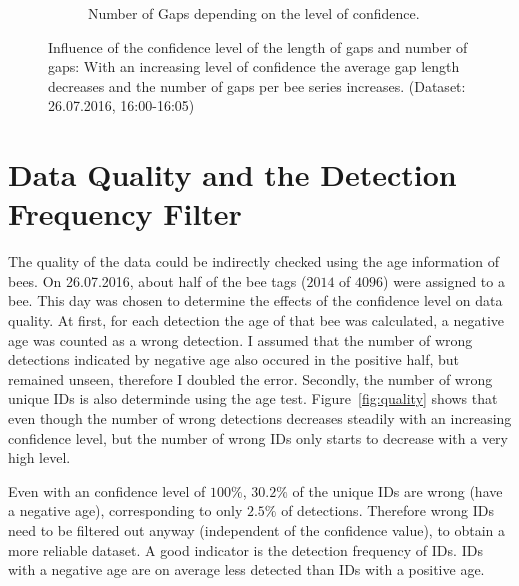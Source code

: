 \begin{figure}
\begin{subfigure}[b]{0.45\textwidth}
		\caption[Number of Gaps]{Number of Gaps depending on the level of confidence.}
		\label{fig:numgaps}
	\end{subfigure}
	\caption[Influence of Confidence Level on Gaps]{Influence of the confidence level of the length of gaps and number of gaps: With an increasing level of confidence the average gap length decreases and the number of gaps per bee series increases. (Dataset: 26.07.2016, 16:00-16:05)}
	\label{fig:gaps}
\end{figure}

\clearpage
\section{Data Quality and the Detection Frequency Filter}
\label{subsec:quality}

The quality of the data could be indirectly checked using the age information of bees. On 26.07.2016, about half of the bee tags ($2014$ of $4096$) were assigned to a bee. This day was chosen to determine the effects of the confidence level on data quality.
At first, for each detection the age of that bee was calculated, a negative age was counted as a wrong detection. I assumed that the number of wrong detections indicated by negative age also occured in the positive half, but remained unseen, therefore I doubled the error. Secondly, the number of wrong unique IDs is also determinde using the age test. Figure~\ref{fig:quality} shows that even though the number of wrong detections
decreases steadily with an increasing confidence level, but the number of wrong IDs only starts to decrease with a very high level.

Even with an confidence level of $100\%$, $30.2\%$ of the unique IDs are wrong (have a negative age), corresponding to only $2.5\%$ of detections. Therefore wrong IDs need to be filtered out anyway (independent of the confidence value), to obtain a more reliable dataset. A good indicator is the detection frequency of IDs. IDs with a negative age are on average less detected than IDs with a positive age.


